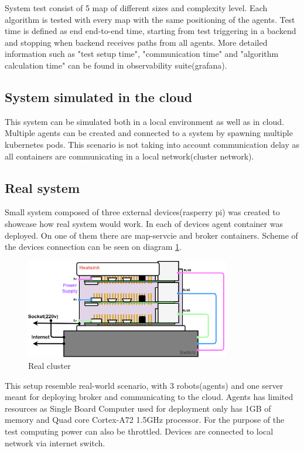 System test consist of 5 map of different sizes and complexity level. Each algorithm is tested with every map with the same positioning of the agents. Test time is defined as end end-to-end time, starting from test triggering in a backend and stopping when backend receives paths from all agents. More detailed information such as "test setup time", "communication time" and "algorithm calculation time" can be found in observability suite(grafana).

\subsection{System simulated in the cloud}
This system can be simulated both in a local environment as well as in cloud. Multiple agents can be created and connected to a system by spawning multiple kubernetes pods. This scenario is not taking into account communication delay as all containers are communicating in a local network(cluster network).

\subsection{Real system}
Small system composed of three external devices(rasperry pi) was created to showcase how real system would work. In each of devices agent container was deployed. On one of them there are map-servcie and broker containers. Scheme of the devices connection can be seen on diagram \ref{fig:cluster}.
\begin{figure}[H]
    \centering
    \includegraphics[width=0.8\textwidth]{pictures/cluster.png}
    \caption{ Real cluster }
    \label{fig:cluster}
\end{figure}

This setup resemble real-world scenario, with 3 robots(agents) and one server meant for deploying broker and communicating to the cloud. Agents has limited resources as Single Board Computer used for deployment only has 1GB of memory and Quad core Cortex-A72 1.5GHz processor\cite{rpi_specs}. For the purpose of the test computing power can also be throttled. Devices are connected to local network via internet switch. 

